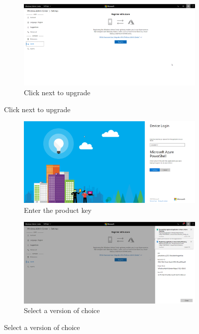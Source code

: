 \label{WACAzure}
\begin{figure}[h]
	\begin{subfigure}{\textwidth}
		\includegraphics[width=0.9\linewidth]{img/WAC_Azure_1.png}
		\captionsetup{width=0.8\linewidth}
		\centering		
		\caption{Click next to upgrade}
		\label{fig:WACAzure1}
	\end{subfigure}
\end{figure}
\begin{figure}[h]\ContinuedFloat
	\begin{subfigure}{0.5\textwidth}
		\captionsetup{width=0.8\linewidth}
		\includegraphics[width=0.9\linewidth]{img/WAC_Azure_2.png}
		\centering
		\caption{Enter the product key}
		\label{fig:WACAzure2}
	\end{subfigure}
	\begin{subfigure}{0.5\textwidth}
		\captionsetup{width=0.8\linewidth}
		\includegraphics[width=0.9\linewidth]{img/WAC_Azure_3.png} 
		\centering
		\caption{Select a version of choice}
		\label{fig:WACAzure3}
	\end{subfigure}
\end{figure}
